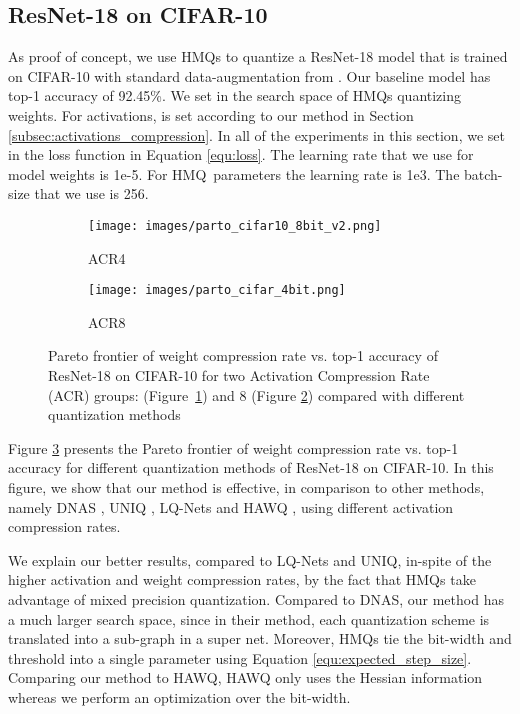 \documentclass{article}
\newcommand{\qb}{HMQ}
\begin{document}
\subsection{ResNet-18 on CIFAR-10}\label{subsec:cifar10}


As proof of concept, we use \qb s to quantize a ResNet-18 model that is trained on \mbox{CIFAR-10} with standard data-augmentation from \cite{he2016deep}. 
Our baseline model has top-1 accuracy of 92.45\%. 
We set  in the search space of \qb s quantizing weights.
For activations,  is set according to our method in Section \ref{subsec:activations_compression}. 
In all of the experiments in this section, we set  in the loss function in Equation \ref{equ:loss}.
The learning rate that we use for model weights is 1e-5. 
For \qb\ parameters the learning rate is 1e3.
The batch-size that we use is 256.\\



\begin{figure}[h]
	
	\begin{subfigure}{.48\textwidth}
		\centering
		\texttt{[image: images/parto\_cifar10\_8bit\_v2.png]}
		\caption{
			ACR4
		}
		\label{fig:cifar10_parto_8bit}
	\end{subfigure}
	\hfill
	\begin{subfigure}{.48\textwidth}
		\centering
		\texttt{[image: images/parto\_cifar\_4bit.png]}
		\caption{ACR8}
		\label{fig:cifar10_parto_4bit}
	\end{subfigure}
	\caption{
		Pareto frontier of weight compression rate vs. top-1 accuracy of ResNet-18 on CIFAR-10 for two Activation Compression Rate (ACR) groups:  \mbox{(Figure \ref{fig:cifar10_parto_8bit})} and 8 (Figure \ref{fig:cifar10_parto_4bit}) compared with different quantization methods
	}
	\label{fig:cifar10resnet-18} 
\end{figure}

Figure \ref{fig:cifar10resnet-18} presents the Pareto frontier of weight compression rate vs. top-1 accuracy for different quantization methods of ResNet-18 on CIFAR-10. 
In this figure, we show that our method is effective, in comparison to other methods, namely DNAS \cite{wu2018mixed}, UNIQ \cite{baskin2018uniq}, LQ-Nets \cite{zhang2018lq} and HAWQ \cite{dong2019hawq}, using different activation compression rates.

We explain our better results, compared to LQ-Nets and UNIQ, in-spite of the higher activation and weight compression rates, by the fact that \qb s take advantage of mixed precision quantization.
Compared to DNAS, our method has a much larger search space, since in their method, each quantization scheme is translated into a sub-graph in a super net. 
Moreover, \qb s tie the bit-width and threshold into a single parameter using Equation \ref{equ:expected_step_size}.
Comparing our method to HAWQ, HAWQ only uses the Hessian information whereas we perform an optimization over the bit-width.
\end{document}
